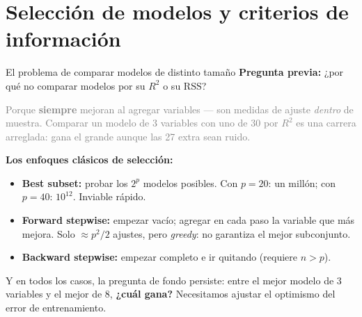 \documentclass{beamer}
\newcommand{\1}{\mathbb{I}}
\newcommand{\RSS}{\mathrm{RSS}}
\begin{document}
\section{Selección de modelos y criterios de información}
\begin{frame}[noframenumbering]
\tableofcontents[currentsection]
\end{frame}

\begin{frame}{El problema de comparar modelos de distinto tamaño}
\small
\textbf{Pregunta previa:} ¿por qué no comparar modelos por su $R^2$ o su $\RSS$?
\pause

\vspace{0.1cm}
\textcolor{gray}{Porque \textbf{siempre} mejoran al agregar variables --- son medidas de ajuste \emph{dentro} de muestra. Comparar un modelo de 3 variables con uno de 30 por $R^2$ es una carrera arreglada: gana el grande aunque las 27 extra sean ruido.}
\pause

\vspace{0.2cm}
\textbf{Los enfoques clásicos de selección:}
\begin{itemize}\itemsep5pt
  \item \textbf{Best subset:} probar los $2^p$ modelos posibles. Con $p = 20$: un millón; con $p = 40$: $10^{12}$. Inviable rápido.
  \item \textbf{Forward stepwise:} empezar vacío; agregar en cada paso la variable que más mejora. Solo $\approx p^2/2$ ajustes, pero \emph{greedy}: no garantiza el mejor subconjunto.
  \item \textbf{Backward stepwise:} empezar completo e ir quitando (requiere $n > p$).
\end{itemize}
\pause

\vspace{0.1cm}
Y en todos los casos, la pregunta de fondo persiste: entre el mejor modelo de 3 variables y el mejor de 8, \textbf{¿cuál gana?} Necesitamos ajustar el optimismo del error de entrenamiento.
\end{frame}
\end{document}
